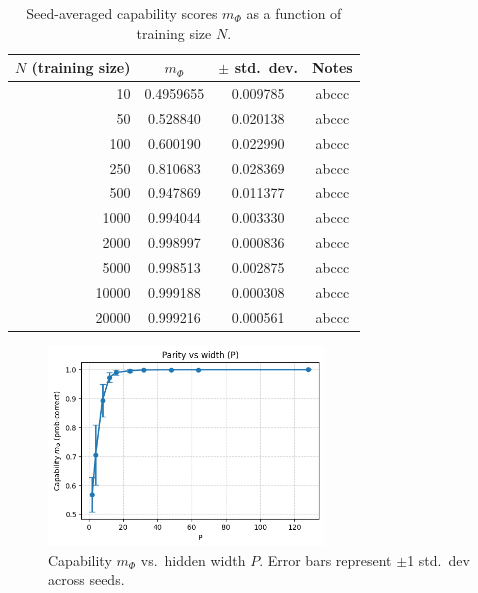\documentclass[12pt]{article}
\begin{document}
\begin{table}[h]
\centering
\begin{tabular}{rccc}
\toprule
$N$ (training size) & $m_\Phi$ & $\pm$ std.~dev. & Notes \\
\midrule
10  & 0.4959655 & 0.009785 & abccc \\
50  & 0.528840 &  0.020138 & abccc \\
100 & 0.600190 & 0.022990 & abccc \\
250 & 0.810683 & 0.028369 & abccc \\
500 & 0.947869 & 0.011377 & abccc \\
1000 & 0.994044 & 0.003330 & abccc \\
2000 & 0.998997 & 0.000836 & abccc \\
5000 & 0.998513 & 0.002875 & abccc \\
10000 & 0.999188 & 0.000308 & abccc \\
20000 & 0.999216 & 0.000561 & abccc \\

\bottomrule
\end{tabular}
\caption{Seed-averaged capability scores $m_\Phi$ as a function of training size $N$.}
\label{tab:mphi-results}
\end{table}
\clearpage

\begin{figure}[h]
    \centering
    \includegraphics[width=0.65\textwidth]{A1_parity/parity_P.png}
    \caption{Capability $m_\Phi$ vs.~hidden width $P$. Error bars represent $\pm$1 std.~dev across seeds.}
    \label{fig:mphi-scaling}
\end{figure}
\end{document}

